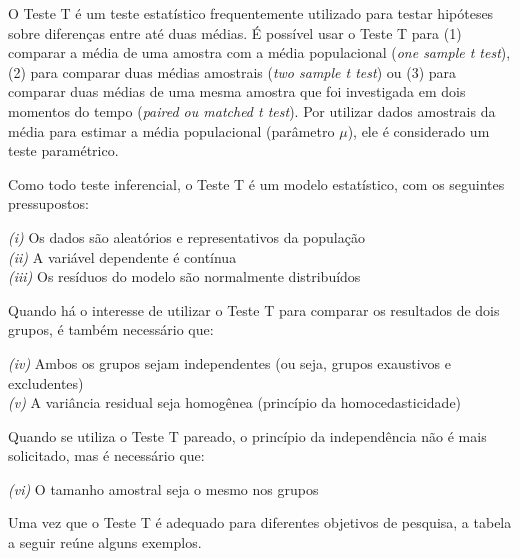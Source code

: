 \documentclass[
]{book}
\begin{document}
O Teste T é um teste estatístico frequentemente utilizado para testar hipóteses sobre diferenças entre até duas médias. É possível usar o Teste T para (1) comparar a média de uma amostra com a média populacional (\emph{one sample t test}), (2) para comparar duas médias amostrais (\emph{two sample t test}) ou (3) para comparar duas médias de uma mesma amostra que foi investigada em dois momentos do tempo (\emph{paired ou matched t test}). Por utilizar dados amostrais da média para estimar a média populacional (parâmetro \(\mu\)), ele é considerado um teste paramétrico.

Como todo teste inferencial, o Teste T é um modelo estatístico, com os seguintes pressupostos:

\emph{(i)} Os dados são aleatórios e representativos da população\\
\emph{(ii)} A variável dependente é contínua\\
\emph{(iii)} Os resíduos do modelo são normalmente distribuídos

Quando há o interesse de utilizar o Teste T para comparar os resultados de dois grupos, é também necessário que:

\emph{(iv)} Ambos os grupos sejam independentes (ou seja, grupos exaustivos e excludentes)\\
\emph{(v)} A variância residual seja homogênea (princípio da homocedasticidade)

Quando se utiliza o Teste T pareado, o princípio da independência não é mais solicitado, mas é necessário que:

\emph{(vi)} O tamanho amostral seja o mesmo nos grupos

Uma vez que o Teste T é adequado para diferentes objetivos de pesquisa, a tabela a seguir reúne alguns exemplos.
\end{document}

